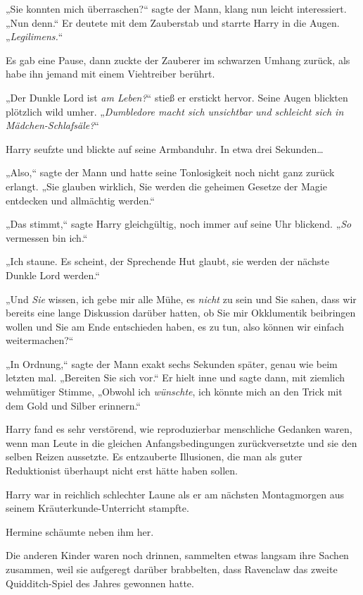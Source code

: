 {„Sie konnten mich überraschen?“ sagte der Mann, klang nun leicht interessiert. „Nun denn.“ Er deutete mit dem Zauberstab und starrte Harry in die Augen. „\emph{Legilimens.}“

Es gab eine Pause, dann zuckte der Zauberer im schwarzen Umhang zurück, als habe ihn jemand mit einem Viehtreiber berührt.

„Der Dunkle Lord ist \emph{am Leben?}“ stieß er erstickt hervor. Seine Augen blickten plötzlich wild umher. „\emph{Dumbledore macht sich unsichtbar und schleicht sich in Mädchen-Schlafsäle?}“

Harry seufzte und blickte auf seine Armbanduhr. In etwa drei Sekunden…

„Also,“ sagte der Mann und hatte seine Tonlosigkeit noch nicht ganz zurück erlangt. „Sie glauben wirklich, Sie werden die geheimen Gesetze der Magie entdecken und allmächtig werden.“

„Das stimmt,“ sagte Harry gleichgültig, noch immer auf seine Uhr blickend. „\emph{So} vermessen bin ich.“

„Ich staune. Es scheint, der Sprechende Hut glaubt, sie werden der nächste Dunkle Lord werden.“

„Und \emph{Sie} wissen, ich gebe mir alle Mühe, es \emph{nicht} zu sein und Sie sahen, dass wir bereits eine lange Diskussion darüber hatten, ob Sie mir Okklumentik beibringen wollen und Sie am Ende entschieden haben, es zu tun, also können wir einfach weitermachen?“

„In Ordnung,“ sagte der Mann exakt sechs Sekunden später, genau wie beim letzten mal. „Bereiten Sie sich vor.“ Er hielt inne und sagte dann, mit ziemlich wehmütiger Stimme, „Obwohl ich \emph{wünschte}, ich könnte mich an den Trick mit dem Gold und Silber erinnern.“

Harry fand es sehr verstörend, wie reproduzierbar menschliche Gedanken waren, wenn man Leute in die gleichen Anfangsbedingungen zurückversetzte und sie den selben Reizen aussetzte. Es entzauberte Illusionen, die man als guter Reduktionist überhaupt nicht erst hätte haben sollen.

\later

Harry war in reichlich schlechter Laune als er am nächsten Montagmorgen aus seinem Kräuterkunde-Unterricht stampfte.

Hermine schäumte neben ihm her.

Die anderen Kinder waren noch drinnen, sammelten etwas langsam ihre Sachen zusammen, weil sie aufgeregt darüber brabbelten, dass Ravenclaw das zweite Quidditch-Spiel des Jahres gewonnen hatte.

}
